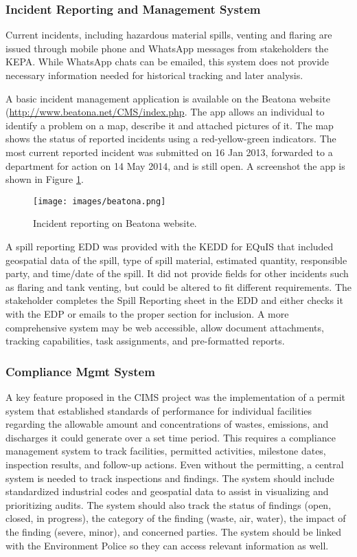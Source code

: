\subsubsection{Incident Reporting and Management System}
Current incidents, including hazardous material spills, venting and flaring are issued through mobile phone and WhatsApp messages from stakeholders the KEPA. While WhatsApp chats can be emailed, this system does not provide necessary information needed for historical tracking and later analysis. 

A basic incident management application is available on the Beatona website (\url{http://www.beatona.net/CMS/index.php}. The app allows an individual to identify a problem on a map, describe it and attached pictures of it. The map shows the status of reported incidents using a red-yellow-green indicators. The most current reported incident was submitted on 16 Jan 2013, forwarded to a department for action on 14 May 2014, and is still open. A screenshot the app is shown in Figure \ref{fig:beatonat}.

%
\begin{figure}[H]
\centering
\texttt{[image: images/beatona.png]} 
\caption{Incident reporting on Beatona website.}
\label{fig:beatonat}
\end{figure}
%

A spill reporting EDD was provided with the KEDD for EQuIS that included geospatial data of the spill, type of spill material, estimated quantity, responsible party, and time/date of the spill. It did not provide fields for other incidents such as flaring and tank venting, but could be altered to fit different requirements. The stakeholder completes the Spill Reporting sheet in the EDD and either checks it with the EDP or emails to the proper section for inclusion. A more comprehensive system may be web accessible, allow document attachments, tracking capabilities, task assignments, and pre-formatted reports.

\subsubsection{Compliance Mgmt System}
A key feature proposed in the CIMS project was the implementation of a permit system that established standards of performance for individual facilities regarding the allowable amount and concentrations of wastes, emissions, and discharges it could generate over a set time period. This requires a compliance management system to track facilities, permitted activities, milestone dates, inspection results, and follow-up actions. Even without the permitting, a central system is needed to track inspections and findings. The system should include standardized industrial codes and geospatial data to assist in visualizing and prioritizing audits. The system should also track the status of findings (open, closed, in progress), the category of the finding (waste, air, water), the impact of the finding (severe, minor), and concerned parties. The system should be linked with the Environment Police so they can access relevant information as well.

